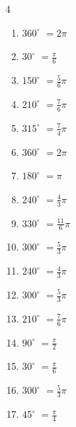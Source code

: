 \begin{multicols}{4}
\begin{enumerate}
  \item $\displaystyle 360^{\circ}$
        $\displaystyle =2\pi$

  \item $\displaystyle 30^{\circ}$
        $\displaystyle =\frac{\pi}{6}$

  \item $\displaystyle 150^{\circ}$
        $\displaystyle =\frac{5}{6}\pi$

  \item $\displaystyle 210^{\circ}$
        $\displaystyle =\frac{7}{6}\pi$

  \item $\displaystyle 315^{\circ}$
        $\displaystyle =\frac{7}{4}\pi$

  \item $\displaystyle 360^{\circ}$
        $\displaystyle =2\pi$

  \item $\displaystyle 180^{\circ}$
        $\displaystyle =\pi$

  \item $\displaystyle 240^{\circ}$
        $\displaystyle =\frac{4}{3}\pi$

  \item $\displaystyle 330^{\circ}$
        $\displaystyle =\frac{11}{6}\pi$

  \item $\displaystyle 300^{\circ}$
        $\displaystyle =\frac{5}{3}\pi$

  \item $\displaystyle 240^{\circ}$
        $\displaystyle =\frac{4}{3}\pi$

  \item $\displaystyle 300^{\circ}$
        $\displaystyle =\frac{5}{3}\pi$

\columnbreak %

  \item $\displaystyle 210^{\circ}$
        $\displaystyle =\frac{7}{6}\pi$

  \item $\displaystyle 90^{\circ}$
        $\displaystyle =\frac{\pi}{2}$

  \item $\displaystyle 30^{\circ}$
        $\displaystyle =\frac{\pi}{6}$

  \item $\displaystyle 300^{\circ}$
        $\displaystyle =\frac{5}{3}\pi$

  \item $\displaystyle 45^{\circ}$
        $\displaystyle =\frac{\pi}{4}$


\end{enumerate}
\end{multicols}
